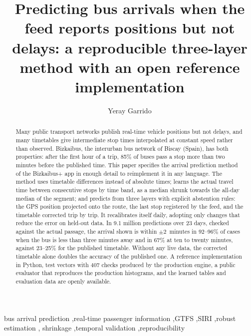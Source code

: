 \documentclass[preprint,11pt,nonatbib]{elsarticle}
\begin{document}
\begin{frontmatter}

\title{Predicting bus arrivals when the feed reports positions but not delays: a reproducible three-layer method
with an open reference implementation}

\author{Yeray Garrido}

\begin{abstract}
Many public transport networks publish real-time vehicle positions but not delays, and many timetables give
intermediate stop times interpolated at constant speed rather than observed. Bizkaibus, the interurban bus network
of Biscay (Spain), has both properties: after the first hour of a trip, 85\% of buses pass a stop more than two
minutes before the published time. This paper specifies the arrival prediction method of the Bizkaibus+ app in
enough detail to reimplement it in any language. The method uses timetable differences instead of absolute times;
learns the actual travel time between consecutive stops by time band, as a median shrunk towards the all-day median
of the segment; and predicts from three layers with explicit abstention rules: the GPS position projected onto the
route, the last stop registered by the feed, and the timetable corrected trip by trip. It recalibrates itself daily,
adopting only changes that reduce the error on held-out data. In 9.1 million predictions over 23 days, checked
against the actual passage, the arrival shown is within $\pm2$~minutes in 92--96\% of cases when the bus is less than
three minutes away and in 67\% at ten to twenty minutes, against 23--25\% for the published timetable. Without any
live data, the corrected timetable alone doubles the accuracy of the published one. A reference implementation in
Python, test vectors with 407 checks produced by the production engine, a public evaluator that reproduces the production
histograms, and the learned tables and evaluation data are openly available.
\end{abstract}

\begin{keyword}
bus arrival prediction \sep real-time passenger information \sep GTFS \sep SIRI \sep robust estimation \sep
shrinkage \sep temporal validation \sep reproducibility
\end{keyword}

\end{frontmatter}
\end{document}
